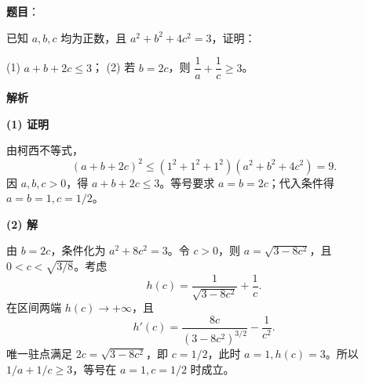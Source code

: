 \begin{answer}

\textbf{题目}：

已知 $a,b,c$ 均为正数，且 $a^2+b^2+4c^2=3$，证明：

(1) $a+b+2c\leq3$；  
(2) 若 $b=2c$，则 $\dfrac1a+\dfrac1c\geq3$。

\textbf{解析}

\textbf{(1) 证明}

由柯西不等式，
\nopagebreak[4]
\[(a+b+2c)^2\leq(1^2+1^2+1^2)(a^2+b^2+4c^2)=9.\]
因 $a,b,c>0$，得 $a+b+2c\leq3$。等号要求 $a=b=2c$；代入条件得 $a=b=1,c=1/2$。

\textbf{(2) 解}

由 $b=2c$，条件化为 $a^2+8c^2=3$。令 $c>0$，则 $a=\sqrt{3-8c^2}$，且 $0<c<\sqrt{3/8}$。考虑
\nopagebreak[4]
\[h(c)=\frac1{\sqrt{3-8c^2}}+\frac1c.\]
在区间两端 $h(c)\to+\infty$，且
\nopagebreak[4]
\[h'(c)=\frac{8c}{(3-8c^2)^{3/2}}-\frac1{c^2}.\]
唯一驻点满足 $2c=\sqrt{3-8c^2}$，即 $c=1/2$，此时 $a=1,h(c)=3$。所以 $1/a+1/c\geq3$，等号在 $a=1,c=1/2$ 时成立。



\end{answer}